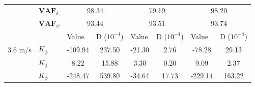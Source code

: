 \begin{table}[]
\begin{tabular}{llcccccc}
                                 & $\mathbf{VAF}_\delta$ & \multicolumn{2}{c}{98.34}                                                                       & \multicolumn{2}{c}{79.19}                                                                       & \multicolumn{2}{c}{98.20}                                                                       \\
                                 & $\mathbf{VAF}_\psi$   & \multicolumn{2}{c}{93.44}                                                                       & \multicolumn{2}{c}{93.51}                                                                       & \multicolumn{2}{c}{93.74}                                                                       \\ \hline
                                 &                       & \multicolumn{1}{l}{\multirow{2}{*}{Value}} & \multicolumn{1}{l}{\multirow{2}{*}{D ($10^{-4}$)}} & \multicolumn{1}{l}{\multirow{2}{*}{Value}} & \multicolumn{1}{l}{\multirow{2}{*}{D ($10^{-4}$)}} & \multicolumn{1}{l}{\multirow{2}{*}{Value}} & \multicolumn{1}{l}{\multirow{2}{*}{D ($10^{-4}$)}} \\
                                 &                       & \multicolumn{1}{l}{}                       & \multicolumn{1}{l}{}                               & \multicolumn{1}{l}{}                       & \multicolumn{1}{l}{}                               & \multicolumn{1}{l}{}                       & \multicolumn{1}{l}{}                               \\ \cline{3-8} 
    3.6 $\si{\meter\per\second}$ & $K_{\dot{\phi}} $     & -109.94                                    & 237.50                                             & -21.30                                     & 2.76                                               & -78.28                                     & 29.13                                              \\
                                 & $K_{\dot{\delta}}$    & 8.22                                       & 15.88                                              & 3.30                                       & 0.20                                               & 9.09                                       & 2.37                                               \\
                                 & $K_{\phi} $           & -248.47                                    & 539.80                                             & -34.64                                     & 17.73                                              & -229.14                                    & 163.22                                             \\

\end{tabular}
\end{table}

